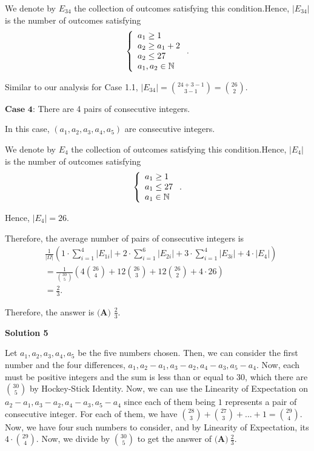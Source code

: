 \begin{enumerate}
 We denote by $E_{34}$ the collection of outcomes satisfying this condition.Hence, $| E_{34} |$ is the number of outcomes satisfying
 \[ \left\{ \begin{array}{l} a_1 \geq 1 \\ a_2 \geq a_1 + 2 \\ a_2 \leq 27 \\ a_1, a_2 \in \Bbb N \end{array} \right.. \]

 Similar to our analysis for Case 1.1,  $| E_{34} | = \binom{24 + 3 - 1}{3 - 1} = \binom{26}{2}$.

 $\textbf{Case 4}$: There are 4 pairs of consecutive integers.

 In this case, $\left( a_1, a_2 , a_3 , a_4 , a_5 \right)$ are consecutive integers.

 We denote by $E_4$ the collection of outcomes satisfying this condition.Hence, $| E_4 |$ is the number of outcomes satisfying
 \[ \left\{ \begin{array}{l} a_1 \geq 1 \\ a_1 \leq 27 \\ a_1 \in \Bbb N \end{array} \right.. \]

 Hence, $| E_4 | = 26$.

 Therefore, the average number of pairs of consecutive integers is
 \begin{align*} & \frac{1}{| \Omega|} \left( 1 \cdot \sum_{i=1}^4 | E_{1i} | + 2 \cdot \sum_{i=1}^6 | E_{2i} | + 3 \cdot \sum_{i=1}^4 | E_{3i} | + 4 \cdot  | E_4 | \right) \\ & = \frac{1}{\binom{30}{5}} \left( 4 \binom{26}{4} + 12 \binom{26}{3} + 12 \binom{26}{2} + 4 \cdot 26 \right) \\ & = \frac{2}{3} . \end{align*}


 Therefore, the answer is $\boxed{\textbf{(A) }\frac{2}{3}}$.

 



\textbf{Solution 5}

Let $a_1, a_2, a_3, a_4, a_5$ be the five numbers chosen. Then, we can consider the first number and the four differences, $a_1, a_2-a_1, a_3-a_2, a_4-a_3, a_5-a_4$. Now, each must be positive integers and the sum is less than or equal to $30$, which there are $\binom{30}{5}$ by Hockey-Stick Identity. Now, we can use the Linearity of Expectation on $a_2-a_1, a_3-a_2, a_4-a_3, a_5-a_4$ since each of them being $1$ represents a pair of consecutive integer. For each of them, we have $\binom{28}{3}+\binom{27}{3}+...+1=\binom{29}{4}$. Now, we have four such numbers to consider, and by Linearity of Expectation, its $4\cdot \binom{29}{4}$. Now, we divide by $\binom{30}{5}$ to get the answer of $\boxed{\textbf{(A)} ~\frac{2}{3}}$.


\end{enumerate}

